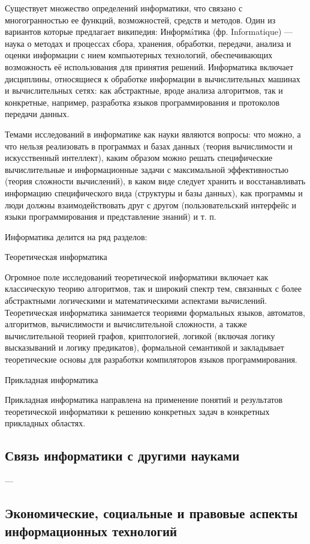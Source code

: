 \documentclass[a4paper]{article}
\begin{document}
Существует множество определений информатики, что связано с многогранностью ее функций, возможностей, средств и методов. Один из вариантов которые предлагает википедия: Информáтика (фр. Informatique) — наука о методах и процессах сбора, хранения, обработки, передачи, анализа и оценки информации с нием компьютерных технологий, обеспечивающих возможность её использования для принятия решений. Информатика включает дисциплины, относящиеся к обработке информации в вычислительных машинах и вычислительных сетях: как абстрактные, вроде анализа алгоритмов, так и конкретные, например, разработка языков программирования и протоколов передачи данных.

Темами исследований в информатике как науки являются вопросы: что можно, а что нельзя реализовать в программах и базах данных (теория вычислимости и искусственный интеллект), каким образом можно решать специфические вычислительные и информационные задачи с максимальной эффективностью (теория сложности вычислений), в каком виде следует хранить и восстанавливать информацию специфического вида (структуры и базы данных), как программы и люди должны взаимодействовать друг с другом (пользовательский интерфейс и языки программирования и представление знаний) и т. п.

Информатика делится на ряд разделов:

Теоретическая информатика

Огромное поле исследований теоретической информатики включает как классическую теорию алгоритмов, так и широкий спектр тем, связанных с более абстрактными логическими и математическими аспектами вычислений. Теоретическая информатика занимается теориями формальных языков, автоматов, алгоритмов, вычислимости и вычислительной сложности, а также вычислительной теорией графов, криптологией, логикой (включая логику высказываний и логику предикатов), формальной семантикой и закладывает теоретические основы для разработки компиляторов языков программирования.

Прикладная информатика

Прикладная информатика направлена на применение понятий и результатов теоретической информатики к решению конкретных задач в конкретных прикладных областях.

\subsection{Связь информатики с другими науками}

---

\subsection{Экономические, социальные и правовые аспекты информационных технологий}
\end{document}
